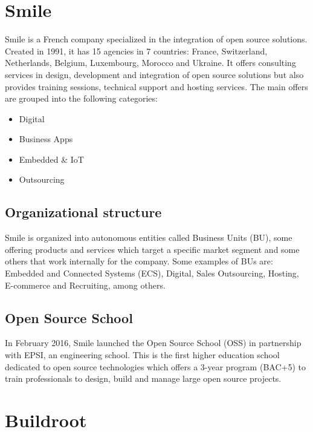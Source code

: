 \documentclass[12pt,a4paper,oneside]{article}
\begin{document}
\newpage
\section{Smile}
Smile is a French company specialized in the integration of open source
solutions. Created in 1991, it has 15 agencies in 7 countries: France,
Switzerland, Netherlands, Belgium, Luxembourg, Morocco and Ukraine. It offers
consulting services in design, development and integration of open source
solutions but also provides training sessions, technical support and hosting
services. The main offers are grouped into the following categories:
\begin{itemize}
  \item Digital
  \item Business Apps
  \item Embedded \& IoT
  \item Outsourcing
\end{itemize}

\subsection{Organizational structure}
Smile is organized into autonomous entities called Business Units (BU), some
offering products and services which target a specific market segment and
some others that work internally for the company. Some examples of BUs are:
Embedded and Connected Systems (ECS), Digital, Sales Outsourcing, Hosting,
E-commerce and Recruiting, among others.

\subsection{Open Source School}
In February 2016, Smile launched the Open Source School (OSS) in partnership
with EPSI, an engineering school. This is the first higher education school
dedicated to open source technologies which offers a 3-year program (BAC+5)
to train professionals to design, build and manage large open source
projects.

\newpage
\section{Buildroot} \label{Buildroot}
\end{document}
